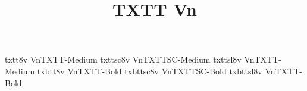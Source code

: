\documentclass[test]{vnsample}
\title{TXTT Vn}
\begin{document}
\begin{shortsample}
   {txtt8v}    {VnTXTT-Medium}
  {txttsc8v}  {VnTXTTSC-Medium}
  {txttsl8v}  {VnTXTT-Medium}
  {txbtt8v}   {VnTXTT-Bold}
 {txbttsc8v} {VnTXTTSC-Bold}
 {txbttsl8v} {VnTXTT-Bold}
\end{shortsample}
\end{document}
